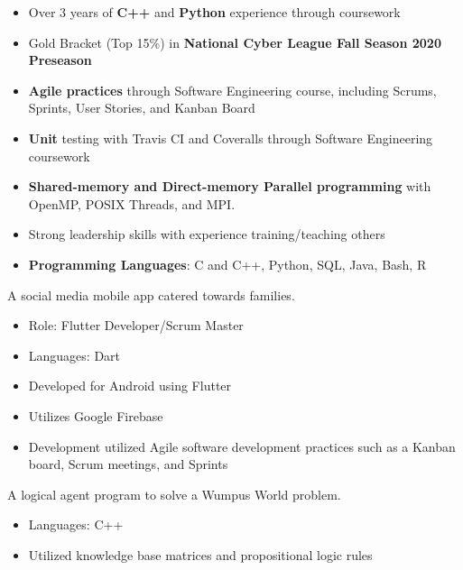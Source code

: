 \documentclass[10pt,a4paper,ragged2e,withhyper]{altacv}
\begin{document}
\begin{paracol}{2}
\begin{itemize}
    \item Over 3 years of \textbf{C++} and  \textbf{Python} experience through coursework
    \item Gold Bracket (Top 15\%) in \textbf{National Cyber League Fall Season 2020 Preseason} 
    \item \textbf{Agile practices} through Software Engineering course, including Scrums, Sprints, User Stories, and Kanban Board
    \item \textbf{Unit} testing with Travis CI and Coveralls through Software Engineering coursework
    \item \textbf{Shared-memory and Direct-memory Parallel programming} with OpenMP, POSIX Threads, and MPI.
    \item Strong leadership skills with experience training/teaching others
    \item \textbf{Programming Languages}: C and C++, Python, SQL, Java, Bash, R
\end{itemize}


\small A social media mobile app catered towards families.
\begin{itemize}
    \item Role: Flutter Developer/Scrum Master
    \item Languages: Dart
    \item Developed for Android using Flutter
    \item Utilizes Google Firebase
    \item Development utilized Agile software development practices such as a Kanban board, Scrum meetings, and Sprints
\end{itemize}
\divider

\small A logical agent program to solve a Wumpus World problem.
\begin{itemize}
    \item Languages: C++
    \item Utilized knowledge base matrices and propositional logic rules
\end{itemize}




\end{paracol}
\end{document}
